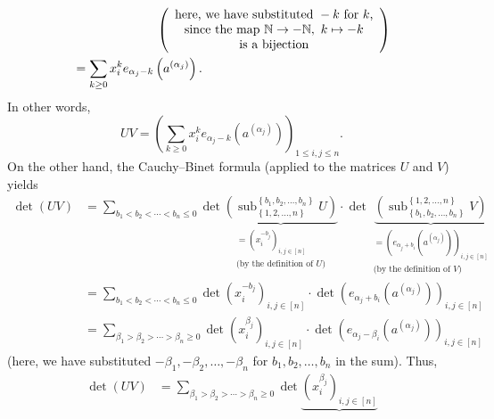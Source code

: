 \documentclass[numbers=enddot,12pt,final,onecolumn,notitlepage]{scrartcl}%
\theoremstyle{definition}
\let\sumnonlimits\sum
\renewcommand{\sum}{\sumnonlimits\limits}
\begin{document}
\begin{enumerate}
\begin{align*}
&  \ \ \ \ \ \ \ \ \ \ \ \ \ \ \ \ \ \ \ \ \left(
\begin{array}
[c]{c}%
\text{here, we have substituted }-k\text{ for }k\text{,}\\
\text{since the map }\mathbb{N}\rightarrow-\mathbb{N},\ k\mapsto-k\\
\text{is a bijection}%
\end{array}
\right) \\
&  =\sum_{k\geq0}x_{i}^{k}e_{\alpha_{j}-k}\left(  a^{\left(  \alpha
_{j}\right)  }\right)  .
\end{align*}
In other words,
\begin{equation}
UV=\left(  \sum_{k\geq0}x_{i}^{k}e_{\alpha_{j}-k}\left(  a^{\left(  \alpha
_{j}\right)  }\right)  \right)  _{1\leq i,j\leq n}. \label{p21.UV=}%
\end{equation}
On the other hand, the Cauchy--Binet formula (applied to the matrices $U$ and
$V$) yields%
\begin{align*}
\det\left(  UV\right)   &  =\sum_{b_{1}<b_{2}<\cdots<b_{n}\leq0}%
\det\underbrace{\left(  \operatorname*{sub}\nolimits_{\left\{  1,2,\ldots
,n\right\}  }^{\left\{  b_{1},b_{2},\ldots,b_{n}\right\}  }U\right)
}_{\substack{=\left(  x_{i}^{-b_{j}}\right)  _{i,j\in\left[  n\right]
}\\\text{(by the definition of }U\text{)}}}\cdot\det\underbrace{\left(
\operatorname*{sub}\nolimits_{\left\{  b_{1},b_{2},\ldots,b_{n}\right\}
}^{\left\{  1,2,\ldots,n\right\}  }V\right)  }_{\substack{=\left(
e_{\alpha_{j}+b_{i}}\left(  a^{\left(  \alpha_{j}\right)  }\right)  \right)
_{i,j\in\left[  n\right]  }\\\text{(by the definition of }V\text{)}}}\\
&  =\sum_{b_{1}<b_{2}<\cdots<b_{n}\leq0}\det\left(  x_{i}^{-b_{j}}\right)
_{i,j\in\left[  n\right]  }\cdot\det\left(  e_{\alpha_{j}+b_{i}}\left(
a^{\left(  \alpha_{j}\right)  }\right)  \right)  _{i,j\in\left[  n\right]  }\\
&  =\sum_{\beta_{1}>\beta_{2}>\cdots>\beta_{n}\geq0}\det\left(  x_{i}%
^{\beta_{j}}\right)  _{i,j\in\left[  n\right]  }\cdot\det\left(  e_{\alpha
_{j}-\beta_{i}}\left(  a^{\left(  \alpha_{j}\right)  }\right)  \right)
_{i,j\in\left[  n\right]  }%
\end{align*}
(here, we have substituted $-\beta_{1},-\beta_{2},\ldots,-\beta_{n}$ for
$b_{1},b_{2},\ldots,b_{n}$ in the sum). Thus,%
\begin{align*}
\det\left(  UV\right)   &  =\sum_{\beta_{1}>\beta_{2}>\cdots>\beta_{n}\geq
0}\det\underbrace{\left(  x_{i}^{\beta_{j}}\right)  _{i,j\in\left[  n\right]
}}
\end{align*}
\end{enumerate}
\end{document}
